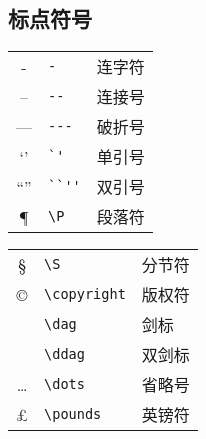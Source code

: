 \subsection{标点符号}
%
\begin{table}[h]
	\centering
	\begin{minipage}[t]{0.46\textwidth}
		\centering
		\begin{tabular}{c p{7em} p{5em}}
			\hline
			-          & \verb|-|          & 连字符 \\
			--         & \verb|--|         & 连接号 \\
			---        & \verb|---|        & 破折号 \\
			`'         & \verb|`'|         & 单引号 \\
			``''       & \verb|``''|       & 双引号 \\
			\P         & \verb|\P|         & 段落符 \\
			\hline
		\end{tabular}
	\end{minipage}
	\qquad
	\begin{minipage}[t]{0.46\textwidth}
		\centering
		\begin{tabular}{c p{7em} p{5em}}
			\hline
			\S         & \verb|\S|         & 分节符 \\
			\copyright & \verb|\copyright| & 版权符 \\
			\dag       & \verb|\dag|       & 剑标 \\
			\ddag      & \verb|\ddag|      & 双剑标 \\
			\dots      & \verb|\dots|      & 省略号 \\
			\pounds    & \verb|\pounds|    & 英镑符 \\
			\hline
		\end{tabular}
	\end{minipage}
\end{table}
%

\newpage
